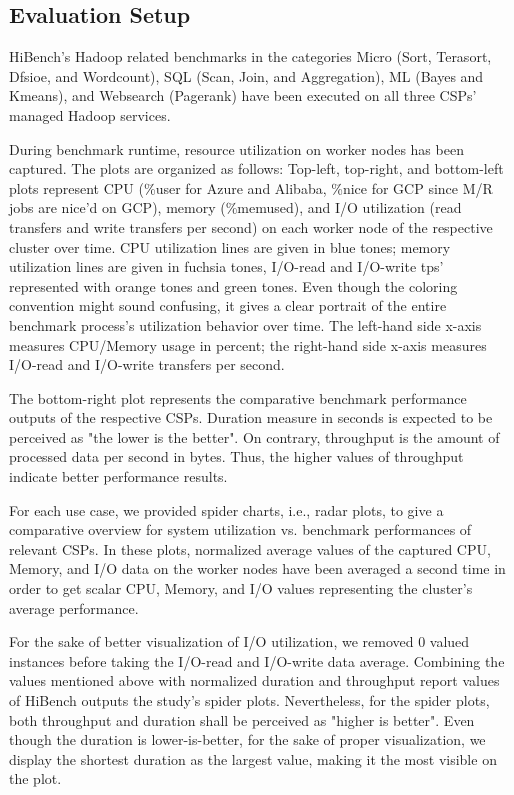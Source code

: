 \documentclass[review]{elsarticle}
\begin{document}

\subsection{Evaluation Setup}
HiBench's Hadoop related benchmarks in the categories Micro (Sort, Terasort, Dfsioe, and Wordcount), SQL (Scan, Join, and Aggregation), ML (Bayes and Kmeans), and Websearch (Pagerank) have been executed on all three CSPs' managed Hadoop services. 

During benchmark runtime, resource utilization on worker nodes has been captured. The plots are organized as follows: Top-left, top-right, and bottom-left plots represent CPU (\%user for Azure and Alibaba, \%nice for GCP since M/R jobs are nice'd on GCP), memory (\%memused), and I/O utilization (read transfers and write transfers per second) on each worker node of the respective cluster over time. CPU utilization lines are given in blue tones; memory utilization lines are given in fuchsia tones, I/O-read and I/O-write tps' represented with orange tones and green tones. Even though the coloring convention might sound confusing, it gives a clear portrait of the entire benchmark process's utilization behavior over time. The left-hand side x-axis measures CPU/Memory usage in percent; the right-hand side x-axis measures I/O-read and I/O-write transfers per second. 

The bottom-right plot represents the comparative benchmark performance outputs of the respective CSPs. Duration measure in seconds is expected to be perceived as "the lower is the better". On contrary, throughput is the amount of processed data per second in bytes. Thus, the higher values of throughput indicate better performance results.

For each use case, we provided spider charts, i.e., radar plots, to give a comparative overview for system utilization vs. benchmark performances of relevant CSPs. In these plots, normalized average values of the captured CPU, Memory, and I/O data on the worker nodes have been averaged a second time in order to get scalar CPU, Memory, and I/O values representing the cluster's average performance. 

For the sake of better visualization of I/O utilization, we removed 0 valued instances before taking the I/O-read and I/O-write data average. Combining the values mentioned above with normalized duration and throughput report values of HiBench outputs the study's spider plots. Nevertheless, for the spider plots, both throughput and duration shall be perceived as "higher is better". Even though the duration is lower-is-better, for the sake of proper visualization, we display the shortest duration as the largest value, making it the most visible on the plot. 
\end{document}
